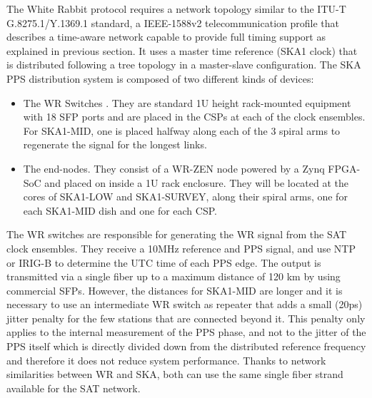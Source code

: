 %
%

The White Rabbit protocol requires a network topology similar to the ITU-T G.8275.1/Y.1369.1 standard, a IEEE-1588v2 telecommunication profile that describes a time-aware network capable to provide full timing support \cite{itu:TG8275_1_Y_1369_1} as explained in previous section. It uses a master time reference (SKA1 clock) that is distributed following a tree topology in a master-slave configuration. The SKA PPS distribution system is composed of two different kinds of devices: 

\begin{itemize}
	\item {The WR Switches \cite{sevensols:wr_switch}. They are standard 1U height rack-mounted equipment with 18 SFP ports and are placed in the CSPs at each of the clock ensembles. For SKA1-MID, one is placed halfway along each of the 3 spiral arms to regenerate the signal for the longest links.}
	\item{The end-nodes. They consist of a WR-ZEN node \cite{sevensols:wr_zen} powered by a Zynq FPGA-SoC and placed on inside a 1U rack enclosure. They will be located at the cores of SKA1-LOW and SKA1-SURVEY, along their spiral arms, one for each SKA1-MID dish and one for each CSP.}
\end{itemize}

The WR switches are responsible for generating the WR signal from the SAT clock ensembles. They receive a 10MHz reference and PPS signal, and use NTP or IRIG-B to determine the UTC time of each PPS edge. The output is transmitted via a single fiber up to a maximum distance of 120 km by using commercial SFPs. However, the distances for SKA1-MID are longer and it is necessary to use an intermediate WR switch as repeater that adds a small (20ps) jitter penalty for the few stations that are connected beyond it. This penalty only applies to the internal measurement of the PPS phase, and not to the jitter of the PPS itself which is directly divided down from the distributed reference frequency and therefore it does not reduce system performance. Thanks to network similarities between WR and SKA, both can use the same single fiber strand available for the SAT network. 

